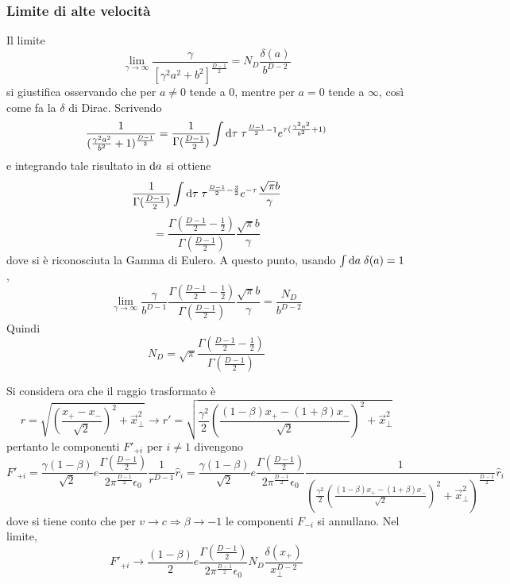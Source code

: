 \subsubsection{Limite di alte velocit\`a}
Il limite
\begin{equation} \label{eq:limND}
	\lim_{\gamma\rightarrow\infty} \frac{\gamma}{[\gamma^2a^2+b^2]^{\frac{D-1}{2}}} = N_D \frac{\delta(a)}{b^{D-2}} 
\end{equation}
si giustifica osservando che per \( a\neq0\) tende a 0, mentre per \( a=0\) tende a $\infty$, cos\`i come fa la $\delta$ di Dirac.
Scrivendo
\[ \frac{1}{(\frac{\gamma^2a^2}{b^2} +1)^{\frac{D-1}{2}}} = \frac{1}{\Gamma({\frac{D-1}{2}})} 
		\int \mathrm{d} \tau \;\tau^{\frac{D-1}{2}-1}e^{\tau(\frac{\gamma^2a^2}{b^2}+1)} \]
e integrando tale risultato in $\mathrm{d} a$ si ottiene
\[ \frac{1}{\Gamma({\frac{D-1}{2}})} 
		\int \mathrm{d} \tau \;\tau^{\frac{D-1}{2}-\frac{3}{2}} e^{-\tau} \frac{\sqrt{\pi}b}{\gamma} \]
\[ = \frac{\Gamma({\frac{D-1}{2}}-\frac{1}{2})}{\Gamma({\frac{D-1}{2}})} \frac{\sqrt{\pi}b}{\gamma} \]
dove si \`e riconosciuta la Gamma di Eulero.
A questo punto, usando \( \int \mathrm{d} a \; \delta(a) = 1 \),
\[ \lim_{\gamma\rightarrow\infty} \frac{\gamma}{b^{D-1}} \frac{\Gamma({\frac{D-1}{2}}-\frac{1}{2})}{\Gamma({\frac{D-1}{2}})} \frac{\sqrt{\pi}b}{\gamma} = \frac{N_D}{b^{D-2}} \]
Quindi
\[ N_D = \sqrt{\pi} \frac{\Gamma({\frac{D-1}{2}}-\frac{1}{2})}{\Gamma({\frac{D-1}{2}})} \]

Si considera ora che il raggio trasformato \`e
\[ r = \sqrt{ (\frac{x_+ - x_-}{\sqrt{2}})^2 + \vec{x}_\perp^2 } \rightarrow 
	r' = \sqrt{ \frac{\gamma^2}{2} (\frac{(1-\beta)x_+ - (1+\beta)x_-}{\sqrt{2}})^2 + \vec{x}_\perp^2 } \]
pertanto le componenti $F'_{+i}$  per \( i\neq1 \) divengono
\[ F'_{+i} = \frac{\gamma(1-\beta)}{\sqrt{2}}  e\frac{\Gamma(\frac{D-1}{2})}{2\pi^{\frac{D-1}{2}}\epsilon_0} \frac{1}{r^{D-1}} \hat{r}_i 
	= \frac{\gamma(1-\beta)}{\sqrt{2}}  e\frac{\Gamma(\frac{D-1}{2})}{2\pi^{\frac{D-1}{2}}\epsilon_0} 
	\frac{1}
	  {(\frac{\gamma^2}{2} 	(\frac{(1-\beta)x_+ - (1+\beta)x_-}{\sqrt{2}})^2 + \vec{x}_\perp^2)^{\frac{D-1}{2}}} \hat{r}_i \]
dove si tiene conto che per \(v\rightarrow c \Rightarrow \beta \rightarrow -1\) le componenti $F_{-i}$ si annullano.
Nel limite, 
\[ F'_{+i} \rightarrow \frac{(1-\beta)}{2}  e\frac{\Gamma(\frac{D-1}{2})}{2\pi^{\frac{D-1}{2}}\epsilon_0}
	N_D \frac{\delta(x_+)}{x_\perp^{D-2}} \]

 



































